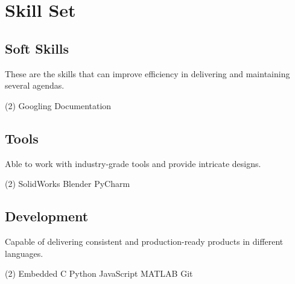 \section*{Skill Set}
%
%
%
\subsection*{Soft Skills}
These are the skills that can improve efficiency in delivering and maintaining several agendas.
\smallskip
\begin{tasks}(2)
  \task Googling
  \task Documentation
\end{tasks}
%
%
\subsection*{Tools}
Able to work with industry-grade tools and provide intricate designs.
\smallskip
\begin{tasks}(2)
  \task SolidWorks
  \task Blender
  \task PyCharm
\end{tasks}
%
%
\subsection*{Development}
Capable of delivering consistent and production-ready products in different languages.
\smallskip
\begin{tasks}(2)
  \task Embedded C
  \task Python
  \task JavaScript
  \task MATLAB
  \task Git
\end{tasks}